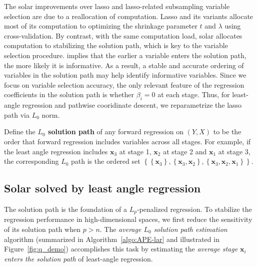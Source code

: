 \documentclass[12pt]{article}
\begin{document}
The solar improvements over lasso and lasso-related subsampling variable selection are due to a reallocation of computation. Lasso and its variants allocate most of its computation to optimizing the shrinkage parameter $t$ and $\lambda$ using cross-validation. By contrast, with the same computation load, solar allocates computation to stabilizing the solution path, which is key to the variable selection procedure. \citet[Theorem~2]{zhang09} implies that the earlier a variable enters the solution path, the more likely it is informative. As a result, a stable and accurate ordering of variables in the solution path may help identify informative variables. Since we focus on variable selection accuracy, the only relevant feature of the regression coefficients in the solution path is whether $\beta_i = 0$ at each stage. Thus, for least-angle regression and pathwise cooridinate descent, we reparametrize the lasso path via $L_0$ norm.
%
\begin{definition}
  Define the \textbf{$L_0$ solution path} of any forward regression on $\left( Y, X \right)$ to be the order that forward regression includes variables across all stages. For example, if the least angle regression includes $\mathbf{x}_3$ at stage 1, $\mathbf{x}_2$ at stage 2 and $\mathbf{x}_1$ at stage 3, the corresponding $L_0$ path is the ordered set $\left\{ \left\{\mathbf{x}_3 \right\}, \left\{ \mathbf{x}_3, \mathbf{x}_2 \right\}, \left\{ \mathbf{x}_3, \mathbf{x}_2, \mathbf{x}_1 \right\} \right\}$.
  \label{def:solution_path}
\end{definition}

\subsection{Solar solved by least angle regression}

The solution path is the foundation of a $L_p$-penalized regression. To stabilize the regression performance in high-dimensional spaces, we first reduce the sensitivity of its solution path when $p > n$. The \emph{average $L_0$ solution path estimation} algorithm (summarized in Algorithm~\ref{algo:APE-lar} and illustrated in Figure~\ref{fig:q_demo}) accomplishes this task by estimating the \emph{average stage $\mathbf{x}_i$ enters the solution path} of least-angle regression.
\end{document}
